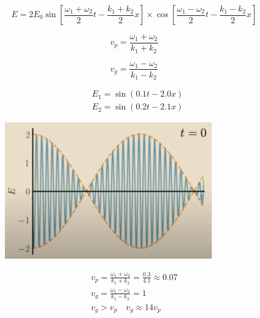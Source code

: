 \begin{equation}
E=2 E_{0} \sin \left[\frac{\omega_{1}+\omega_{2}}{2} t-\frac{k_{1}+k_{2}}{2} x\right] \times \cos \left[\frac{\omega_{1}-\omega_{2}}{2} t-\frac{k_{1}-k_{2}}{2} x\right]
\end{equation}

\begin{equation}
v_p = \frac{\omega_{1}+\omega_{2}}{k_{1}+k_{2}}
\end{equation}

\begin{equation}
v_g = \frac{\omega_{1}-\omega_{2}}{k_{1}-k_{2}}
\end{equation}

\begin{equation}
\begin{aligned}
&E_{1}=\sin (0.1 t-2.0 x) \\
&E_{2}=\sin (0.2 t-2.1 x)
\end{aligned}
\end{equation}

\begin{figure}[H]
   \centering
    \includegraphics[width=0.8\textwidth]{lesson6/t=0.pdf}
    \label{fig: 1}
    \begin{center}
        \caption{}
    \end{center}
\end{figure}

\begin{equation}
\begin{gathered}
v_{p}=\frac{\omega_{1}+\omega_{2}}{k_{1}+k_{2}}=\frac{0.3}{4.1} \approx 0.07 \\
v_{g}=\frac{\omega_{1}-\omega_{2}}{k_{1}-k_{2}}=1 
\begin{array}{l}
\end{array} \\
v_{g}>v_{p} \quad v_{g} \approx 14 v_{p}
\end{gathered}
\end{equation}


